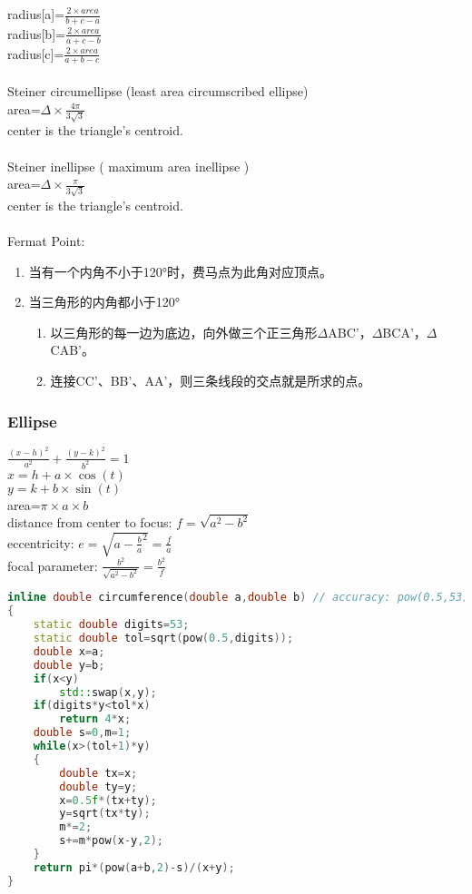 radius[a]=$\frac{2\times area}{b+c-a}$\\
radius[b]=$\frac{2\times area}{a+c-b}$\\
radius[c]=$\frac{2\times area}{a+b-c}$\\
\\
Steiner circumellipse (least area circumscribed ellipse)\\
    area=$\Delta \times \frac{4\pi}{3\sqrt{3}}$\\
    center is the triangle's centroid.\\
\\
Steiner inellipse ( maximum area inellipse )\\
    area=$\Delta \times \frac{\pi}{3\sqrt{3}}$\\
    center is the triangle's centroid.\\
\\
Fermat Point:
\begin{enumerate}
\item 当有一个内角不小于120°时，费马点为此角对应顶点。
\item 当三角形的内角都小于120°
\begin{enumerate}
\item 以三角形的每一边为底边，向外做三个正三角形$\Delta$ABC'，$\Delta$BCA'，$\Delta$CAB'。
\item 连接CC'、BB'、AA'，则三条线段的交点就是所求的点。
\end{enumerate}
\end{enumerate}

\subsubsection{Ellipse}
$\frac{(x-h)^2}{a^2} + \frac{(y-k)^2}{b^2} = 1$\\

$x=h+a \times \cos(t)$\\
$y=k+b \times \sin(t)$\\

area=$\pi \times a \times b$\\
distance from center to focus: $f=\sqrt{a^2-b^2}$\\
eccentricity: $e=\sqrt{a-\frac{b}{a}^2}=\frac{f}{a}$\\
focal parameter: $\frac{b^2}{\sqrt{a^2-b^2}}=\frac{b^2}{f}$\\

\begin{lstlisting}[language=C++]
inline double circumference(double a,double b) // accuracy: pow(0.5,53);
{
    static double digits=53;
    static double tol=sqrt(pow(0.5,digits));
    double x=a;
    double y=b;
    if(x<y)
        std::swap(x,y);
    if(digits*y<tol*x)
        return 4*x;
    double s=0,m=1;
    while(x>(tol+1)*y)
    {
        double tx=x;
        double ty=y;
        x=0.5f*(tx+ty);
        y=sqrt(tx*ty);
        m*=2;
        s+=m*pow(x-y,2);
    }
    return pi*(pow(a+b,2)-s)/(x+y);
}
\end{lstlisting}

